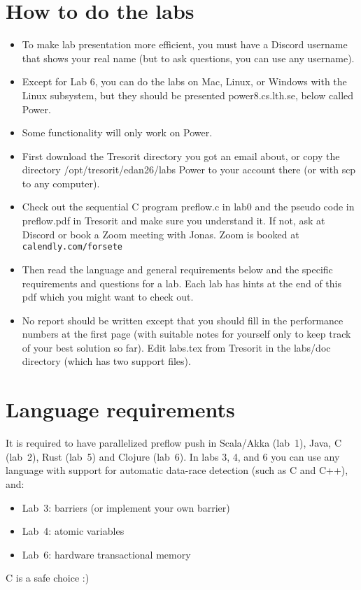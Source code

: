 \documentclass{forsete}
\begin{document}
\section{How to do the labs}
\begin{itemize}
\item To make lab presentation more efficient, you must have a Discord username that shows your real name (but to ask questions, you can use any username).
\item Except for Lab 6, you can do the labs on Mac, Linux, or Windows with the Linux subsystem, but they
should be presented power8.cs.lth.se, below called Power.
\item Some functionality will only work on Power.
\item First download the Tresorit directory you got an email about, or copy the directory /opt/tresorit/edan26/labs Power to your account 
there (or with scp to any computer).
\item Check out the sequential C program preflow.c in lab0 and the pseudo code in preflow.pdf in Tresorit and
make sure you understand it. If not, ask at Discord or book a Zoom meeting with Jonas. Zoom is booked 
at \verb!calendly.com/forsete!
\item Then read the language and general requirements below and the specific requirements and questions for a lab. Each
lab has hints at the end of this pdf which you might want to check out.
\item No report should be written except that you should fill in the performance numbers at the first page (with suitable notes for yourself 
only to keep track of your best solution so far). Edit labs.tex from Tresorit in the labs/doc directory (which has two support files).
\end{itemize}
\section{\label{lang.sec}Language requirements}
It is required to have parallelized preflow push in Scala/Akka (lab~1), Java, C (lab~2), Rust (lab~5) 
and Clojure (lab~6). In labs 3, 4, and 6 you can use any language with support for 
automatic data-race detection (such as C and C++), and:
\begin{itemize}
\item Lab~3: barriers (or implement your own barrier)
\item Lab~4: atomic variables 
\item Lab~6: hardware transactional memory
\end{itemize}
C is a safe choice :)
\end{document}
